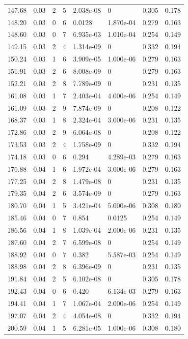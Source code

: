 \documentclass[preview]{standalone}
\begin{document}
{{{\begin{tabular}{L{1.2cm}C{1.2cm} C{0.3cm}C{0.5cm} C{1.4cm}C{1.4cm} C{1.4cm}C{1.4cm}}
  147.68  &  0.03  & 2     &  5 &  2.038e-08  & 0  & 0.305 &  0.178   \\ 
  148.20  &  0.03  & 0     &  6 &  0.0128  & 1.870e-04  & 0.279 &  0.163   \\ 
  148.60  &  0.03  & 0     &  7 &  6.935e-03  & 1.010e-04  & 0.254 &  0.149   \\ 
  149.15  &  0.03  & 2     &  4 &  1.314e-09  & 0  & 0.332 &  0.194   \\ 
  150.24  &  0.03  & 1     &  6 &  3.909e-05  & 1.000e-06  & 0.279 &  0.163   \\ 
  151.91  &  0.03  & 2     &  6 &  8.008e-09  & 0  & 0.279 &  0.163   \\ 
  152.21  &  0.03  & 2     &  8 &  7.789e-09  & 0  & 0.231 &  0.135   \\ 
  161.08  &  0.03  & 1     &  7 &  2.403e-04  & 4.000e-06  & 0.254 &  0.149   \\ 
  161.09  &  0.03  & 2     &  9 &  7.874e-09  & 0  & 0.208 &  0.122   \\ 
  168.37  &  0.03  & 1     &  8 &  2.324e-04  & 3.000e-06  & 0.231 &  0.135   \\ 
  172.86  &  0.03  & 2     &  9 &  6.064e-08  & 0  & 0.208 &  0.122   \\ 
  173.53  &  0.03  & 2     &  4 &  1.758e-09  & 0  & 0.332 &  0.194   \\ 
  174.18  &  0.03  & 0     &  6 &  0.294  & 4.289e-03  & 0.279 &  0.163   \\ 
  176.88  &  0.04  & 1     &  6 &  1.972e-04  & 3.000e-06  & 0.279 &  0.163   \\ 
  177.25  &  0.04  & 2     &  8 &  1.479e-08  & 0  & 0.231 &  0.135   \\ 
  179.35  &  0.04  & 2     &  6 &  3.574e-09  & 0  & 0.279 &  0.163   \\ 
  180.70  &  0.04  & 1     &  5 &  3.421e-04  & 5.000e-06  & 0.308 &  0.180   \\ 
  185.46  &  0.04  & 0     &  7 &  0.854  & 0.0125  & 0.254 &  0.149   \\ 
  186.56  &  0.04  & 1     &  8 &  1.039e-04  & 2.000e-06  & 0.231 &  0.135   \\ 
  187.60  &  0.04  & 2     &  7 &  6.599e-08  & 0  & 0.254 &  0.149   \\ 
  188.92  &  0.04  & 0     &  7 &  0.382  & 5.587e-03  & 0.254 &  0.149   \\ 
  188.98  &  0.04  & 2     &  8 &  6.396e-09  & 0  & 0.231 &  0.135   \\ 
  191.84  &  0.04  & 2     &  5 &  6.102e-08  & 0  & 0.305 &  0.178   \\ 
  192.43  &  0.04  & 0     &  6 &  0.420  & 6.134e-03  & 0.279 &  0.163   \\ 
  194.41  &  0.04  & 1     &  7 &  1.067e-04  & 2.000e-06  & 0.254 &  0.149   \\ 
  197.07  &  0.04  & 2     &  4 &  4.054e-08  & 0  & 0.332 &  0.194   \\ 
  200.59  &  0.04  & 1     &  5 &  6.281e-05  & 1.000e-06  & 0.308 &  0.180   \\ 
\hline 
\end{tabular} 

}}}
\end{document}
